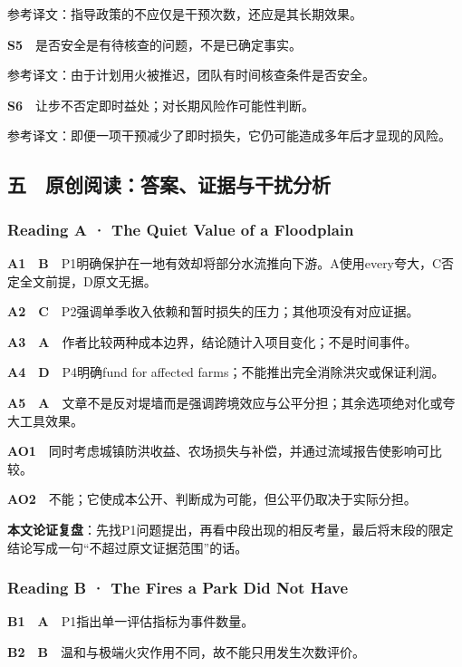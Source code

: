 \documentclass[
  11pt,
]{ctexart}
\begin{document}
参考译文：指导政策的不应仅是干预次数，还应是其长期效果。

\textbf{S5}　是否安全是有待核查的问题，不是已确定事实。

参考译文：由于计划用火被推迟，团队有时间核查条件是否安全。

\textbf{S6}　让步不否定即时益处；对长期风险作可能性判断。

参考译文：即便一项干预减少了即时损失，它仍可能造成多年后才显现的风险。

\subsection{五　原创阅读：答案、证据与干扰分析}\label{ux4e94-ux539fux521bux9605ux8bfbux7b54ux6848ux8bc1ux636eux4e0eux5e72ux6270ux5206ux6790}

\subsubsection{Reading A · The Quiet Value of a
Floodplain}\label{reading-a-the-quiet-value-of-a-floodplain-1}

\textbf{A1　B}　P1明确保护在一地有效却将部分水流推向下游。A使用every夸大，C否定全文前提，D原文无据。

\textbf{A2　C}　P2强调单季收入依赖和暂时损失的压力；其他项没有对应证据。

\textbf{A3　A}　作者比较两种成本边界，结论随计入项目变化；不是时间事件。

\textbf{A4　D}　P4明确fund for affected
farms；不能推出完全消除洪灾或保证利润。

\textbf{A5　A}　文章不是反对堤墙而是强调跨境效应与公平分担；其余选项绝对化或夸大工具效果。

\textbf{AO1}　同时考虑城镇防洪收益、农场损失与补偿，并通过流域报告使影响可比较。

\textbf{AO2}　不能；它使成本公开、判断成为可能，但公平仍取决于实际分担。

\textbf{本文论证复盘}：先找P1问题提出，再看中段出现的相反考量，最后将末段的限定结论写成一句``不超过原文证据范围''的话。

\subsubsection{Reading B · The Fires a Park Did Not
Have}\label{reading-b-the-fires-a-park-did-not-have-1}

\textbf{B1　A}　P1指出单一评估指标为事件数量。

\textbf{B2　B}　温和与极端火灾作用不同，故不能只用发生次数评价。
\end{document}
